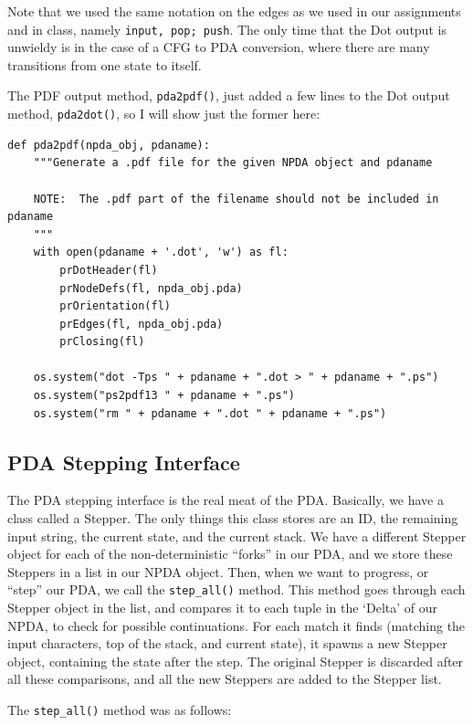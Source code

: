 \documentclass[a4paper]{article}
\begin{document}
Note that we used the same notation on the edges as we used in our assignments
and in class, namely \texttt{input, pop; push}.  The only time that the Dot
output is unwieldy is in the case of a CFG to PDA conversion, where there are
many transitions from one state to itself.

The PDF output method, \texttt{pda2pdf()}, just added a few lines to the Dot
output method, \texttt{pda2dot()}, so I will show just the former here:

\begin{verbatim}
def pda2pdf(npda_obj, pdaname):
    """Generate a .pdf file for the given NPDA object and pdaname

    NOTE:  The .pdf part of the filename should not be included in pdaname
    """
    with open(pdaname + '.dot', 'w') as fl:
        prDotHeader(fl)
        prNodeDefs(fl, npda_obj.pda)
        prOrientation(fl)
        prEdges(fl, npda_obj.pda)
        prClosing(fl)

    os.system("dot -Tps " + pdaname + ".dot > " + pdaname + ".ps")
    os.system("ps2pdf13 " + pdaname + ".ps")
    os.system("rm " + pdaname + ".dot " + pdaname + ".ps")
\end{verbatim}

\subsection{PDA Stepping Interface}

The PDA stepping interface is the real meat of the PDA.  Basically, we have a
class called a Stepper.  The only things this class stores are an ID, the
remaining input string, the current state, and the current stack.  We have a
different Stepper object for each of the non-deterministic ``forks'' in our PDA,
and we store these Steppers in a list in our NPDA object.  Then, when we want
to progress, or ``step'' our PDA, we call the \texttt{step\_all()} method.
This method goes through each Stepper object in the list, and compares it to
each tuple in the `Delta' of our NPDA, to check for possible continuations.
For each match it finds (matching the input characters, top of the stack, and
current state), it spawns a new Stepper object, containing the state after the
step.  The original Stepper is discarded after all these comparisons, and all
the new Steppers are added to the Stepper list.

The \texttt{step\_all()} method was as follows:
\end{document}
